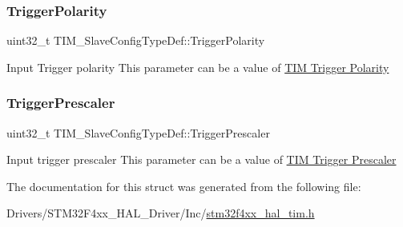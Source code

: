 \subsubsection{\texorpdfstring{Trigger\+Polarity}{TriggerPolarity}}
{\footnotesize\ttfamily uint32\+\_\+t T\+I\+M\+\_\+\+Slave\+Config\+Type\+Def\+::\+Trigger\+Polarity}

Input Trigger polarity This parameter can be a value of \hyperlink{group___t_i_m___trigger___polarity}{T\+IM Trigger Polarity} \mbox{\label{struct_t_i_m___slave_config_type_def_a57be6d41d77a968f1daeac7b65b1ab4c}} 
\subsubsection{\texorpdfstring{Trigger\+Prescaler}{TriggerPrescaler}}
{\footnotesize\ttfamily uint32\+\_\+t T\+I\+M\+\_\+\+Slave\+Config\+Type\+Def\+::\+Trigger\+Prescaler}

Input trigger prescaler This parameter can be a value of \hyperlink{group___t_i_m___trigger___prescaler}{T\+IM Trigger Prescaler} 

The documentation for this struct was generated from the following file\+:\begin{DoxyCompactItemize}
\item 
Drivers/\+S\+T\+M32\+F4xx\+\_\+\+H\+A\+L\+\_\+\+Driver/\+Inc/\hyperlink{stm32f4xx__hal__tim_8h}{stm32f4xx\+\_\+hal\+\_\+tim.\+h}\end{DoxyCompactItemize}
